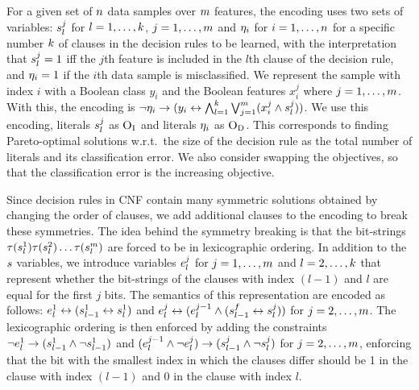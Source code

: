 For a given set of $n$ data samples over $m$ features, the encoding uses two sets of variables:
$s_l^j$ for $l=1,\dots,k$, $j=1,\dots,m$ and $\eta_i$ for $i=1,\dots,n$ for a specific number $k$ of clauses in the decision rules to be learned, with the interpretation that $s_l^j=1$ iff the $j$th feature is included in the $l$th clause of the decision rule, and $\eta_i=1$ if the $i$th data sample is misclassified.
We represent the sample with index $i$ with a Boolean class $y_i$ and the Boolean features $x_i^j$ where $j=1,\dots,m$.
With this, the encoding is $\lnot \eta_i \rightarrow (y_i \leftrightarrow \bigwedge_{l=1}^k \bigvee_{j=1}^m (x_i^j \land s_l^j))$.
We use this encoding, literals $s_l^j$ as $\textsc{O}_{\text{I}}$ and literals $\eta_i$ as $\textsc{O}_{\text{D}}$.
This corresponds to finding Pareto-optimal solutions w.r.t.\ the size of the decision rule as the total number of literals and its classification error.
We also consider swapping the objectives, so that the classification error is the increasing objective.

Since decision rules in CNF contain many symmetric solutions obtained by changing the order of clauses, we add additional clauses to the encoding to break these symmetries.
The idea behind the symmetry breaking is that the bit-strings $\tau(s_l^1)\tau(s_l^2)\dots\tau(s_l^m)$ are forced to be in lexicographic ordering.
In addition to the $s$ variables, we introduce variables $e_l^j$ for $j=1,\dots,m$ and $l=2,\dots,k$ that represent whether the bit-strings of the clauses with index $(l-1)$ and $l$ are equal for the first $j$ bits.
The semantics of this representation are encoded as follows:
$e_l^1 \leftrightarrow (s_{l-1}^1 \leftrightarrow s_l^1)$ and $e_l^j \leftrightarrow (e_l^{j-1} \land (s_{l-1}^f \leftrightarrow s_l^j))$ for $j=2,\dots,m$.
The lexicographic ordering is then enforced by adding the constraints $\lnot e_l^1 \rightarrow (s_{l-1}^1 \land \lnot s_{l-1}^1)$ and $(e_l^{j-1} \land \lnot e_l^j) \rightarrow (s_{l-1}^j \land \lnot s_l^j)$ for $j=2,\dots,m$, enforcing that the bit with the smallest index in which the clauses differ should be 1 in the clause with index $(l-1)$ and 0 in the clause with index $l$.


